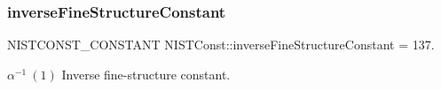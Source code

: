 \subsubsection{\texorpdfstring{inverse\+Fine\+Structure\+Constant}{inverseFineStructureConstant}}
{\footnotesize\ttfamily N\+I\+S\+T\+C\+O\+N\+S\+T\+\_\+\+C\+O\+N\+S\+T\+A\+NT N\+I\+S\+T\+Const\+::inverse\+Fine\+Structure\+Constant = 137.}

$\alpha^{-1} \ (1)$ Inverse fine-\/structure constant. 